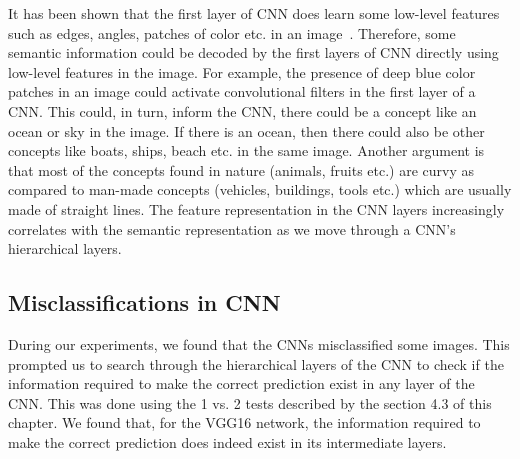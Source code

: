 It has been shown that the first layer of CNN does learn some low-level features such as edges, angles, patches of color etc. in an image~\cite{CNNVisual1,CNNVisual2}. Therefore, some semantic information could be decoded by the first layers of CNN directly using low-level features in the image. For example, the presence of deep blue color patches in an image could activate convolutional filters in the first layer of a CNN. This could, in turn, inform the CNN, there could be a concept like an ocean or sky in the image. If there is an ocean, then there could also be other concepts like boats, ships, beach etc. in the same image. Another argument is that most of the concepts found in nature (animals, fruits etc.) are curvy as compared to man-made concepts (vehicles, buildings, tools etc.) which are usually made of straight lines. The feature representation in the CNN layers increasingly correlates with the semantic representation as we move through a CNN's hierarchical layers.

\subsection{Misclassifications in CNN}

During our experiments, we found that the CNNs misclassified some images. This prompted us to search through the hierarchical layers of the CNN to check if the information required to make the correct prediction exist in any layer of the CNN. This was done using the 1 vs. 2 tests described by the section 4.3 of this chapter. We found that, for the VGG16 network, the information required to make the correct prediction does indeed exist in its intermediate layers. 

